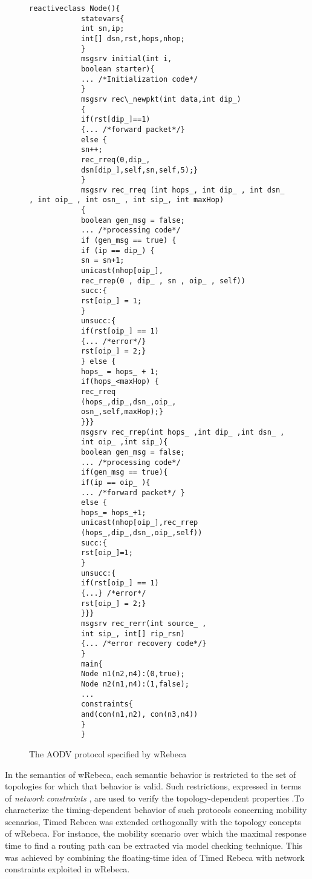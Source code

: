 	\begin{figure*}
		\begin{center}
			\begin{lstlisting}[language=rebeca,multicols=2]
			reactiveclass Node(){
			statevars{
			int sn,ip;
			int[] dsn,rst,hops,nhop;
			}
			msgsrv initial(int i, 
			boolean starter){ 
			... /*Initialization code*/
			}			
			msgsrv rec\_newpkt(int data,int dip_)
			{
			if(rst[dip_]==1) 
			{... /*forward packet*/}
			else {                       
			sn++;
			rec_rreq(0,dip_,
			dsn[dip_],self,sn,self,5);}
			}   		
			msgsrv rec_rreq (int hops_, int dip_ , int dsn_ , int oip_ , int osn_ , int sip_, int maxHop) 
			{    
			boolean gen_msg = false;
			... /*processing code*/
			if (gen_msg == true) {
			if (ip == dip_) {
			sn = sn+1;
			unicast(nhop[oip_],
			rec_rrep(0 , dip_ , sn , oip_ , self))
			succ:{
			rst[oip_] = 1;
			}
			unsucc:{
			if(rst[oip_] == 1) 
			{... /*error*/}
			rst[oip_] = 2;}
			} else {
			hops_ = hops_ + 1;
			if(hops_<maxHop) {
			rec_rreq
			(hops_,dip_,dsn_,oip_,
			osn_,self,maxHop);} 
			}}}  		
			msgsrv rec_rrep(int hops_ ,int dip_ ,int dsn_ ,
			int oip_ ,int sip_){      
			boolean gen_msg = false;
			... /*processing code*/
			if(gen_msg == true){
			if(ip == oip_ ){
			... /*forward packet*/ }
			else {
			hops_= hops_+1;
			unicast(nhop[oip_],rec_rrep
			(hops_,dip_,dsn_,oip_,self))
			succ:{
			rst[oip_]=1;
			}
			unsucc:{
			if(rst[oip_] == 1) 
			{...} /*error*/
			rst[oip_] = 2;}
			}}}
			msgsrv rec_rerr(int source_ ,
			int sip_, int[] rip_rsn) 
			{... /*error recovery code*/}
			}
			main{
			Node n1(n2,n4):(0,true);
			Node n2(n1,n4):(1,false);
			...
			constraints{
			and(con(n1,n2), con(n3,n4)) 
			}  
			}
			\end{lstlisting}
		\end{center}
		\caption{The AODV protocol specified by wRebeca \label{code:aodv}\cite{AODVFatemeh}}
	\end{figure*} 
	
	
	In the semantics of wRebeca, each semantic behavior is restricted to the set of topologies for which that behavior is valid. Such restrictions, expressed in terms of \emph{network constraints} \cite{FatemehFI10,FatemehFI19}, are used to verify the topology-dependent properties \cite{FORM,CSI2018}.To characterize the timing-dependent behavior of such protocols concerning mobility scenarios, Timed Rebeca was extended orthogonally with the topology concepts of wRebeca. For instance, the mobility scenario over which the maximal response time to find a routing path can be extracted via model checking technique. This was achieved by combining the floating-time idea of Timed Rebeca with network constraints exploited in wRebeca. 